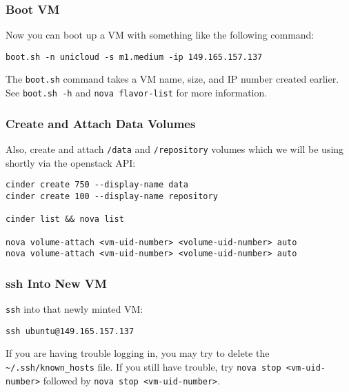 \documentclass[onecolumn,9pt]{article}
\begin{document}
\subsubsection{Boot VM}
\label{sec:orgheadline10}

Now you can boot up a VM with something like the following command:

\lstset{frame=lines,basicstyle=\footnotesize,numbers=left,numberstyle=\tiny,language=sh,label= ,caption= ,captionpos=b}
\begin{lstlisting}
boot.sh -n unicloud -s m1.medium -ip 149.165.157.137
\end{lstlisting}

The \texttt{boot.sh} command takes a VM name, size, and IP number created earlier. See \texttt{boot.sh -h} and \texttt{nova flavor-list} for more information.

\subsubsection{Create and Attach Data Volumes}
\label{sec:orgheadline11}

Also, create and attach \texttt{/data} and \texttt{/repository}  volumes which we will be using shortly via the openstack API:

\lstset{frame=lines,basicstyle=\footnotesize,numbers=left,numberstyle=\tiny,language=:eval,label= ,caption= ,captionpos=b}
\begin{lstlisting}
cinder create 750 --display-name data
cinder create 100 --display-name repository

cinder list && nova list

nova volume-attach <vm-uid-number> <volume-uid-number> auto
nova volume-attach <vm-uid-number> <volume-uid-number> auto
\end{lstlisting}

\subsubsection{ssh Into New VM}
\label{sec:orgheadline12}

\texttt{ssh} into that newly minted VM:

\lstset{frame=lines,basicstyle=\footnotesize,numbers=left,numberstyle=\tiny,language=:eval,label= ,caption= ,captionpos=b}
\begin{lstlisting}
ssh ubuntu@149.165.157.137
\end{lstlisting}

If you are having trouble logging in, you may try to delete the \texttt{\textasciitilde{}/.ssh/known\_hosts} file. If you still have trouble, try \texttt{nova stop <vm-uid-number>} followed by \texttt{nova stop <vm-uid-number>}.
\end{document}

